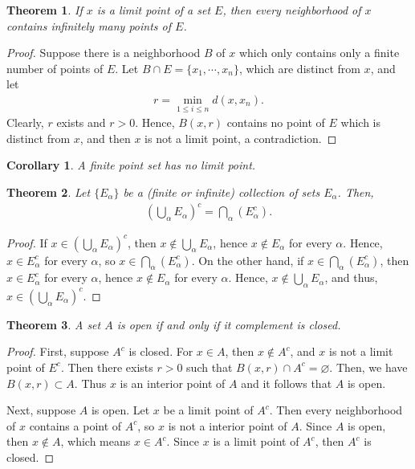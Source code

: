 \documentclass[11pt]{book}
\newtheorem{theorem}{Theorem}[chapter]
\newtheorem{corollary}{Corollary}[theorem]
\theoremstyle{definition}
\numberwithin{equation}{chapter}
\begin{document}
\medskip

\begin{theorem}
If $x$ is a limit point of a set $E$, then every neighborhood of $x$ contains infinitely many points of $E$.
\end{theorem}
\begin{proof}
Suppose there is a neighborhood $B$ of $x$ which only contains only a finite number of points of $E$. Let $B \cap E = \{x_1, \cdots, x_n\}$, which are distinct from $x$, and let 
\begin{align*}
    r = \min_{1\leq i\leq n} d(x, x_n).
\end{align*}
Clearly, $r$ exists and $r > 0$. Hence, $B(x,r)$ contains no point of $E$ which is distinct from $x$, and then $x$ is not a limit point, a contradiction. 
\end{proof}

\medskip

\begin{corollary}
A finite point set has no limit point.
\end{corollary}

\medskip

\begin{theorem}\label{th_18}
Let $\{E_{\alpha}\}$ be a (finite or infinite) collection of sets $E_{\alpha}$. Then,
\begin{align*}
    \left(\bigcup_{\alpha} E_{\alpha}\right)^c = \bigcap_{\alpha} (E_{\alpha}^c).
\end{align*}
\end{theorem}
\begin{proof}
If $x \in \left(\bigcup_{\alpha} E_{\alpha}\right)^c$, then $x \notin \bigcup_{\alpha} E_{\alpha}$, hence $x \notin E_{\alpha}$ for every $\alpha$. Hence, $x \in E_{\alpha}^c$ for every $\alpha$, so $x \in \bigcap_{\alpha} (E_{\alpha}^c)$.
On the other hand, if $x \in \bigcap_{\alpha} (E_{\alpha}^c)$, then $x \in E_{\alpha}^c$ for every $\alpha$, hence $x \notin E_{\alpha}$ for every $\alpha$. Hence, $x \notin \bigcup_{\alpha} E_{\alpha}$, and thus, $x \in \left(\bigcup_{\alpha} E_{\alpha}\right)^c$. 
\end{proof}

\medskip

\begin{theorem}\label{th_19}
A set $A$ is open if and only if it complement is closed.
\end{theorem}
\begin{proof}
First, suppose $A^c$ is closed. For $x\in A$, then $x\notin A^c$, and $x$ is not a limit point of $E^c$. Then there exists $r>0$ such that $B(x,r) \cap A^c = \varnothing$. Then, we have $B(x,r) \subset A$. Thus $x$ is an interior point of $A$ and it follows that $A$ is open.

Next, suppose $A$ is open. Let $x$ be a limit point of $A^c$. Then every neighborhood of $x$ contains a point of $A^c$, so $x$ is not a interior point of $A$. Since $A$ is open, then $x\notin A$, which means $x\in A^c$. Since $x$ is a limit point of $A^c$, then $A^c$ is closed.
\end{proof}
\end{document}
